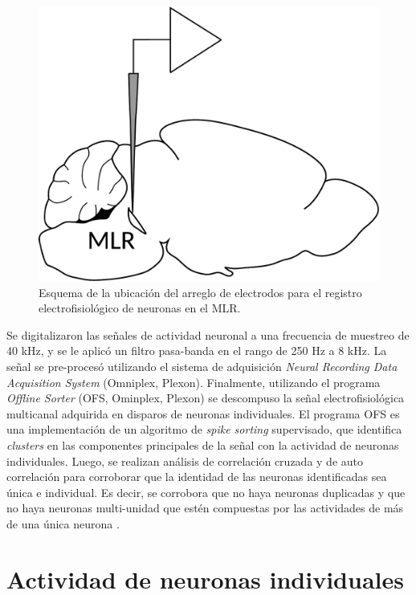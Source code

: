 \begin{figure}[!htbp]
    \centering
    \includegraphics[width=0.3\linewidth]{figuras/cerebro/mlr.pdf}
    \caption{Esquema de la ubicación del arreglo de electrodos para el registro electrofisiológico de neuronas en el MLR.}
    \label{fig:mlr}
\end{figure}

Se digitalizaron las señales de actividad neuronal a una frecuencia de muestreo de 40 kHz, y se le aplicó un filtro pasa-banda en el rango de 250 Hz a 8 kHz. La señal se pre-procesó utilizando el sistema de adquisición \textit{Neural Recording Data Acquisition System} (Omniplex, Plexon). Finalmente, utilizando el programa \textit{Offline Sorter} (OFS, Ominplex, Plexon) se descompuso la señal electrofisiológica multicanal adquirida en disparos de neuronas individuales. El programa OFS es una implementación de un algoritmo de \textit{spike sorting} supervisado, que identifica \textit{clusters} en las componentes principales de la señal con la actividad de neuronas individuales. Luego, se realizan análisis de correlación cruzada y de auto correlación para corroborar que la identidad de las neuronas identificadas sea única e individual. Es decir, se corrobora que no haya neuronas duplicadas y que no haya neuronas multi-unidad que estén compuestas por las actividades de más de una única neurona \cite{esposito_defensive}.

\section{Actividad de neuronas individuales}\label{sec:neurona}


